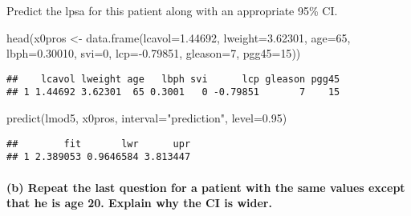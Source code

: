 \documentclass[
]{article}
\newenvironment{Shaded}{\begin{snugshade}}{\end{snugshade}}
\newcommand{\AttributeTok}[1]{\textcolor[rgb]{0.77,0.63,0.00}{#1}}
\newcommand{\DecValTok}[1]{\textcolor[rgb]{0.00,0.00,0.81}{#1}}
\newcommand{\FloatTok}[1]{\textcolor[rgb]{0.00,0.00,0.81}{#1}}
\newcommand{\FunctionTok}[1]{\textcolor[rgb]{0.00,0.00,0.00}{#1}}
\newcommand{\NormalTok}[1]{#1}
\newcommand{\OtherTok}[1]{\textcolor[rgb]{0.56,0.35,0.01}{#1}}
\newcommand{\SpecialCharTok}[1]{\textcolor[rgb]{0.00,0.00,0.00}{#1}}
\newcommand{\StringTok}[1]{\textcolor[rgb]{0.31,0.60,0.02}{#1}}
\begin{document}
Predict the lpsa for this patient along with an appropriate 95\% CI.

\begin{Shaded}
\begin{Highlighting}[]
\FunctionTok{head}\NormalTok{(x0pros }\OtherTok{\textless{}{-}} \FunctionTok{data.frame}\NormalTok{(}\AttributeTok{lcavol=}\FloatTok{1.44692}\NormalTok{,}
                                              \AttributeTok{lweight=}\FloatTok{3.62301}\NormalTok{,}
                                              \AttributeTok{age=}\DecValTok{65}\NormalTok{,}
                                              \AttributeTok{lbph=}\FloatTok{0.30010}\NormalTok{,}
                                              \AttributeTok{svi=}\DecValTok{0}\NormalTok{,}
                                              \AttributeTok{lcp=}\SpecialCharTok{{-}}\FloatTok{0.79851}\NormalTok{,}
                                              \AttributeTok{gleason=}\DecValTok{7}\NormalTok{,}
                                              \AttributeTok{pgg45=}\DecValTok{15}\NormalTok{))}
\end{Highlighting}
\end{Shaded}

\begin{verbatim}
##    lcavol lweight age   lbph svi      lcp gleason pgg45
## 1 1.44692 3.62301  65 0.3001   0 -0.79851       7    15
\end{verbatim}

\begin{Shaded}
\begin{Highlighting}[]
\FunctionTok{predict}\NormalTok{(lmod5, x0pros, }\AttributeTok{interval=}\StringTok{"prediction"}\NormalTok{, }\AttributeTok{level=}\FloatTok{0.95}\NormalTok{)}
\end{Highlighting}
\end{Shaded}

\begin{verbatim}
##        fit       lwr      upr
## 1 2.389053 0.9646584 3.813447
\end{verbatim}

\hypertarget{b-repeat-the-last-question-for-a-patient-with-the-same-values-except-that-he-is-age-20.-explain-why-the-ci-is-wider.}{%
\paragraph{(b) Repeat the last question for a patient with the same
values except that he is age 20. Explain why the CI is
wider.}\label{b-repeat-the-last-question-for-a-patient-with-the-same-values-except-that-he-is-age-20.-explain-why-the-ci-is-wider.}}
\end{document}
